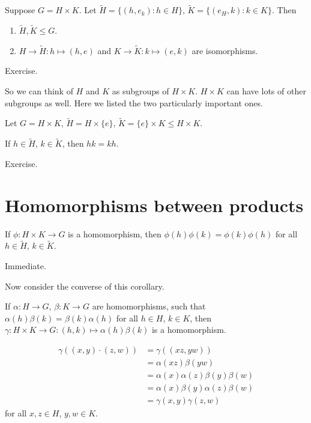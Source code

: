 \begin{prop}
Suppose $G=H\times K$. Let $\tilde{H}=\{(h,e_k): h\in H\}$, $\tilde{K} = \{(e_H,k):k\in K\}$. Then 
\begin{enumerate}[label=(\alph*)]
\item $\tilde{H}, \tilde{K}\le G$.
\item $H\to \tilde{H}: h\mapsto (h,e)$ and $K\to \tilde{K}: k\mapsto (e,k)$ are isomorphisms.
\end{enumerate}
\end{prop}

\begin{pf}
Exercise.
\end{pf}

\begin{remark}
	So we can think of $H$ and $K$ as subgroups of $H\times K$. $H\times K$ 
can have lots of other subgroups as well. Here we listed the two particularly important ones.
\end{remark}

Let $G=H\times K$, $\tilde{H}=H\times \{e\}$, $\tilde{K} = \{e\}\times K \le H\times K$.

\begin{lemma}
If $h\in \tilde{H}$, $k\in\tilde{K}$, then $hk=kh$.
\end{lemma}

\begin{pf}
Exercise.
\end{pf}

\section{Homomorphisms between products}
\begin{corr}
If $\phi:H\times K\to G$ is a homomorphism, then $\phi(h)\phi(k)=\phi(k)\phi(h)$ for all $h\in \tilde{H}$, $k\in\tilde{K}$.
\end{corr}

\begin{pf}
Immediate.
\end{pf}

Now consider the converse of this corollary.
\begin{lemma}
If $\alpha: H\to G$, $\beta: K\to G$ are homomorphisms, such that $\alpha(h)\beta(k)=\beta(k)\alpha(h)$ for all $h\in H$, $k\in K$, then $\gamma: H\times K\to G: (h,k)\mapsto \alpha(h)\beta(k)$ is a homomorphism.
\end{lemma}


\begin{pf}
\begin{equation*}
\begin{aligned}
\gamma((x,y)\cdot (z,w)) &= \gamma((xz,yw))\\
&= \alpha (xz)\beta(yw)\\
&= \alpha(x)\alpha(z)\beta(y)\beta(w)\\
&= \alpha(x)\beta(y)\alpha(z)\beta(w)\\
&= \gamma(x,y) \gamma(z,w)
\end{aligned}
\end{equation*}
for all $x,z\in H$, $y,w\in K$.
\end{pf}

